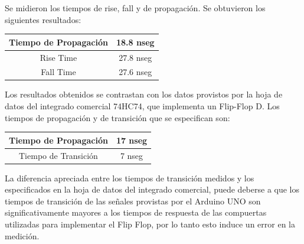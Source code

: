 Se midieron los tiempos de rise, fall y de propagación. Se obtuvieron los siguientes resultados:


\begin{center}
\begin{tabular}{|c|c|}
\hline 
Tiempo de Propagación & 18.8 nseg \\ 
\hline 
Rise Time & 27.8 nseg \\ 
\hline 
Fall Time & 27.6 nseg \\ 
\hline 
\end{tabular} 
\end{center}

Los resultados obtenidos se contrastan con los datos provistos por la hoja de datos del integrado comercial 74HC74, que implementa un Flip-Flop D. Los tiempos de propagación y de transición que se especifican son:

\begin{center}
\begin{tabular}{|c|c|}
\hline 
Tiempo de Propagación & 17 nseg \\ 
\hline 
Tiempo de Transición & 7 nseg \\ 
\hline 
\end{tabular} 
\end{center}

La diferencia apreciada entre los tiempos de transición medidos y los especificados en la hoja de datos del integrado comercial, puede deberse a que los tiempos de transición de las señales provistas por el Arduino UNO son significativamente mayores a los tiempos de respuesta de las compuertas utilizadas para implementar el Flip Flop, por lo tanto esto induce un error en la medición. 
